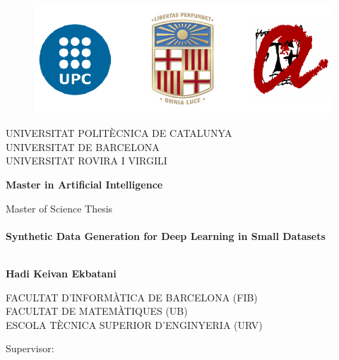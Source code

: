 \begin{titlepage}
	
	\begin{figure}[t]
		\centering
		\includegraphics[scale=0.3]{images/upc_ub_urv}
	\end{figure}    
	
	
	\begin{center}
		
		{\large \uppercase{Universitat politècnica de Catalunya}} \medskip \\
		{\large \uppercase{Universitat de Barcelona}} \medskip \\
		{\large \uppercase{Universitat Rovira i Virgili}} \medskip \\
		\vspace*{1cm}
		\begin{center}
			\Large	\bf   Master in Artificial Intelligence
		\end{center}
		

		{\Large Master of Science Thesis} \vspace*{1.0cm} \\
		\HRule \\[0.3cm]
		{ \huge \bfseries Synthetic Data Generation for Deep Learning in Small Datasets }\\[0.4cm] %
%
		\HRule \\[1.cm]
	\end{center}

	
	\thispagestyle{empty}
	\begin{center}
	\Large	\bf Hadi Keivan Ekbatani\\
	\end{center}
	\begin{center}
		{\large \uppercase{Facultat d'informàtica de Barcelona (FIB)}} \medskip \\
		{\large \uppercase{Facultat de Matemàtiques (UB)}} \medskip \\
		{\large \uppercase{Escola tècnica superior d'enginyeria (URV)}} \medskip \\
	\end{center}
	\vspace*{1.cm}
	\begin{center} 
		\begin{multicols}{2}	
		{\large Supervisor:}
		

\end{multicols}
\end{center}
\end{titlepage}
